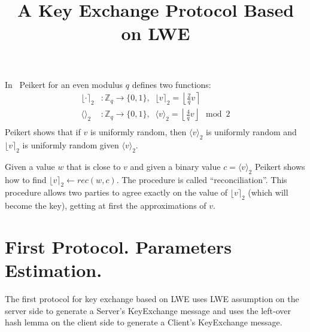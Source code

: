 \documentclass[12pt]{article}
\begin{document}
\title{A Key Exchange Protocol Based on LWE}
\maketitle

In~\cite{P14} Peikert for an even modulus $q$ defines two functions:
\begin{align*}
\lfloor \cdot \rceil_2&: \mathbb{Z}_q \rightarrow \{0, 1\},\;\; \lfloor v \rceil_2 = \left\lfloor \frac{2}{q} v\right\rceil\\
\langle \rangle_2&: \mathbb{Z}_q \rightarrow \{0, 1\},\;\; \langle v \rangle_2 = \left\lfloor \frac{4}{q} v\right\rfloor\mod 2\\
\end{align*}
Peikert shows that if $v$ is uniformly random, then $\langle v \rangle_2$ is uniformly random and $\lfloor v \rceil_2$ is uniformly random given $\langle v \rangle_2$.

Given a value $w$ that is close to $v$ and given a binary value $c = \langle v \rangle_2$ Peikert shows how to find $\lfloor v \rceil_2 \leftarrow rec(w, c)$. The procedure is called ``reconciliation''. This procedure allows two parties to agree exactly on the value of $\lfloor v  \rceil_2$ (which will become the key), getting at first the approximations of $v$.

\section{First Protocol. Parameters Estimation.}
The first protocol for key exchange based on LWE uses LWE assumption on the server side to generate a Server's KeyExchange message and uses the left-over hash lemma on the client side to generate a Client's KeyExchange message.
\end{document}
